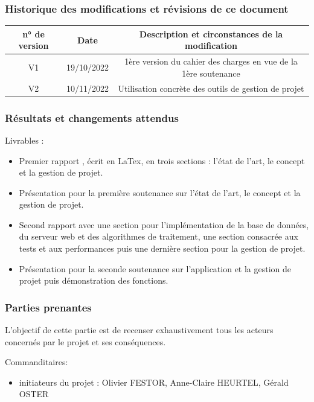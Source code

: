 \documentclass[11pt]{article}
\begin{document}
\subsubsection{Historique des modifications et révisions de ce document}
\begin{center}
	\begin{tabular}{|c|c|c|}
	\hline
	\textbf{n° de version} &	\textbf{Date}	&\textbf{Description et circonstances de la modification}\\
	\hline
    V1&	19/10/2022&	1ère version du cahier des charges en vue de la 1ère soutenance\\
    \hline
    V2 & 10/11/2022&Utilisation concrète des outils de gestion de projet\\
    \hline
	\end{tabular}
\end{center}


\subsubsection{Résultats et changements attendus}
	Livrables : 
	\begin{itemize}
		\item 	\color{red} Premier rapport \color{black}, écrit en LaTex, en trois sections : l’état de l’art, le concept et la gestion de projet.
		\item	\color{red} Présentation pour la première soutenance \color{black} sur l’état de l’art, le concept et la gestion de projet.
		\item	\color{red} Second rapport \color{black} avec une section pour l’implémentation de la base de données, du serveur web et des algorithmes de traitement, une section consacrée aux tests et aux performances puis une dernière section pour la gestion de projet.
		\item   \color{red} Présentation pour la seconde soutenance \color{black} sur l’application et la gestion de projet puis démonstration des fonctions.
	\end{itemize}
	
\subsubsection{Parties prenantes}
L'objectif de cette partie est de recenser exhaustivement tous les acteurs concernés par le projet et ses conséquences. 
\vspace{0.2cm}

\noindent Commanditaires: 
\begin{itemize}
	\item 
	initiateurs du projet : Olivier FESTOR, Anne-Claire HEURTEL, Gérald OSTER 
	\end{itemize}
	
\end{document}
